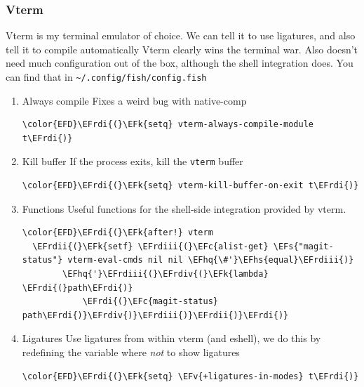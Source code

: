 \documentclass{scrartcl}
\newcommand{\EFk}[1]{\textcolor{EFk}{#1}} %
\newcommand{\EFs}[1]{\textcolor{EFs}{#1}} %
\newcommand{\EFc}[1]{\textcolor{EFc}{#1}} %
\newcommand{\EFv}[1]{\textcolor{EFv}{#1}} %
\newcommand{\EFhq}[1]{#1} %
\newcommand{\EFhs}[1]{#1} %
\newcommand{\EFrdi}[1]{#1} %
\newcommand{\EFrdii}[1]{#1} %
\newcommand{\EFrdiii}[1]{#1} %
\newcommand{\EFrdiv}[1]{#1} %
\begin{document}
\subsubsection{Vterm}
\label{sec:org1cee937}
Vterm is my terminal emulator of choice. We can tell it to use ligatures, and also tell it to compile automatically
Vterm clearly wins the terminal war. Also doesn't need much configuration out of
the box, although the shell integration does. You can find that in \texttt{\textasciitilde{}/.config/fish/config.fish}
\begin{enumerate}
\item Always compile
\label{sec:orgb6e1248}
Fixes a weird bug with native-comp
\begin{Code}
\begin{Verbatim}[]
\color{EFD}\EFrdi{(}\EFk{setq} vterm-always-compile-module t\EFrdi{)}
\end{Verbatim}
\end{Code}

\item Kill buffer
\label{sec:orgb834c67}
If the process exits, kill the \texttt{vterm} buffer
\begin{Code}
\begin{Verbatim}[]
\color{EFD}\EFrdi{(}\EFk{setq} vterm-kill-buffer-on-exit t\EFrdi{)}
\end{Verbatim}
\end{Code}

\item Functions
\label{sec:org69b8344}
Useful functions for the shell-side integration provided by vterm.
\begin{Code}
\begin{Verbatim}[]
\color{EFD}\EFrdi{(}\EFk{after!} vterm
  \EFrdii{(}\EFk{setf} \EFrdiii{(}\EFc{alist-get} \EFs{"magit-status"} vterm-eval-cmds nil nil \EFhq{\#'}\EFhs{equal}\EFrdiii{)}
        \EFhq{'}\EFrdiii{(}\EFrdiv{(}\EFk{lambda} \EFrdi{(}path\EFrdi{)}
            \EFrdi{(}\EFc{magit-status} path\EFrdi{)}\EFrdiv{)}\EFrdiii{)}\EFrdii{)}\EFrdi{)}
\end{Verbatim}
\end{Code}

\item Ligatures
\label{sec:orgc288bbe}
Use ligatures from within vterm (and eshell), we do this by redefining the variable where \emph{not} to show ligatures
\begin{Code}
\begin{Verbatim}[]
\color{EFD}\EFrdi{(}\EFk{setq} \EFv{+ligatures-in-modes} t\EFrdi{)}
\end{Verbatim}
\end{Code}
\end{enumerate}
\end{document}
